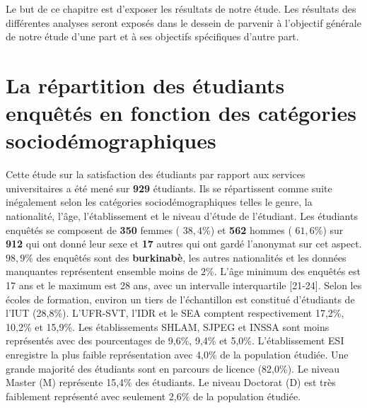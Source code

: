 \documentclass[
12pt,          %
a4paper,       %
oneside,      %
openright      %
]{report}          %
\begin{document}
		Le but de ce chapitre est d’exposer les résultats de notre étude. Les résultats des différentes analyses seront exposés dans le dessein de parvenir à l’objectif générale de notre étude d’une part et à ses objectifs spécifiques d’autre part.
		
		
		\section{La répartition des étudiants enquêtés en fonction des catégories
			sociodémographiques}
		\label{sec:Analyse socio-démographique}
		
	Cette étude sur la satisfaction des étudiants par rapport aux services universitaires a été mené sur \textbf{929} étudiants. Ils se répartissent comme suite inégalement selon les catégories sociodémographiques telles le genre, la nationalité, l'âge, l'établissement et le niveau d'étude de l'étudiant. 
	Les étudiants enquêtés se composent de \textbf{350} femmes ( $38{,}4\%$) et \textbf{562} hommes ( $61{,}6\%$) sur \textbf{912} qui ont donné leur sexe et \textbf{17} autres qui ont gardé l'anonymat sur cet aspect.
    $98{,}9\%$ des enquêtés sont des \textbf{burkinabè}, les autres nationalités et les données manquantes représentent ensemble moins de $2\%$.
	L’âge minimum des enquêtés est 17 ans et le maximum est 28 ans, avec un intervalle interquartile [21-24].
	Selon les écoles de formation, environ un tiers de
	l’échantillon est constitué d’étudiants de l’IUT (28,8\%). L’UFR-SVT, l’IDR et le SEA comptent respectivement 17,2\%, 10,2\% et 15,9\%. Les établissements SHLAM, SJPEG et INSSA sont moins représentés avec des pourcentages de 9,6\%, 9,4\% et 5,0\%. L’établissement ESI enregistre la plus faible représentation avec 4,0\% de la population étudiée. 
	Une grande majorité des étudiants sont en parcours de licence (82,0\%).  Le niveau Master (M) représente 15,4\% des étudiants. Le niveau Doctorat (D) est très faiblement représenté avec seulement 2,6\% de la population étudiée.
		
\end{document}
